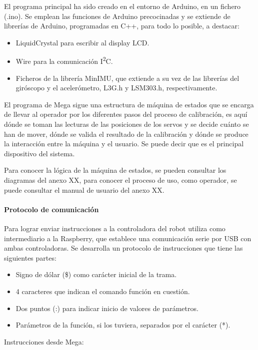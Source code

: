 El programa principal ha sido creado en el entorno de Arduino, en un fichero (.ino). Se emplean las funciones de Arduino precocinadas y se extiende de librerías de Arduino, programadas en C++, para todo lo posible, a destacar:
\begin{itemize}
  \item LiquidCrystal para escribir al display LCD.
  \item Wire para la comunicación  I\textsuperscript{2}C.
  \item Ficheros de la librería MinIMU, que extiende a su vez de las librerías del giróscopo y el acelerómetro, L3G.h y LSM303.h, respectivamente.
\end{itemize}

El programa de Mega sigue una estructura de máquina de estados que se encarga de llevar al operador por los diferentes pasos del proceso de calibración, es aquí dónde se toman las lecturas de las posiciones de los servos y se decide cuánto se han de mover, dónde se valida el resultado de la calibración y dónde se produce la interacción entre la máquina y el usuario. Se puede decir que es el principal dispositivo del sistema.

Para conocer la lógica de la máquina de estados, se pueden consultar los diagramas del anexo XX, para conocer el proceso de uso, como operador, se puede consultar el manual de usuario del anexo XX.

\paragraph{Protocolo de comunicación}

Para lograr enviar instrucciones a la controladora del robot utiliza como intermediario a la Raspberry, que establece una comunicación serie por USB con ambas controladoras. Se desarrolla un protocolo de instrucciones que tiene las siguientes partes:

\begin{itemize}
  \item Signo de dólar (\$) como carácter inicial de la trama.
  \item 4 caracteres que indican el comando función en cuestión.
  \item Dos puntos (:) para indicar inicio de valores de parámetros.
  \item Parámetros de la función, si los tuviera, separados por el carácter (*).
\end{itemize}

Instrucciones desde Mega:

